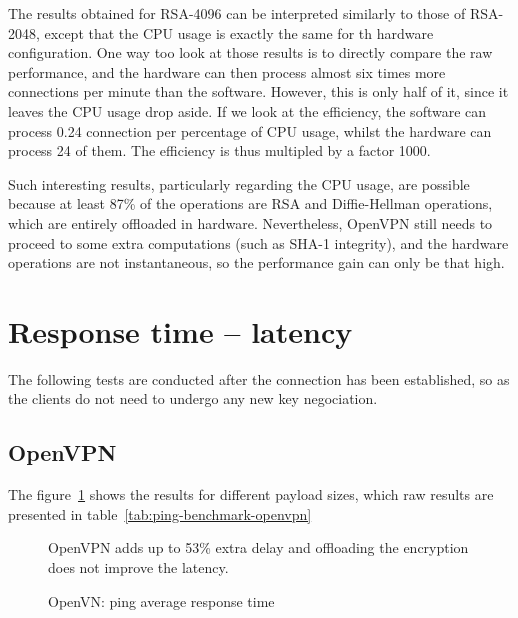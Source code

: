 \noindent The results obtained for RSA-4096 can be interpreted similarly to those of RSA-2048, except that the CPU usage is exactly the same for th hardware configuration.
One way too look at those results is to directly compare the raw performance, and the hardware can then process almost six times more connections per minute than the software.
However, this is only half of it, since it leaves the CPU usage drop aside.
If we look at the efficiency, the software can process 0.24 connection per percentage of CPU usage, whilst the hardware can process 24 of them.
The efficiency is thus multipled by a factor 1000.

Such interesting results, particularly regarding the CPU usage, are possible because at least 87\% of the operations are RSA and Diffie-Hellman operations, which are entirely offloaded in hardware.
Nevertheless, OpenVPN still needs to proceed to some extra computations (such as SHA-1 integrity), and the hardware operations are not instantaneous, so the performance gain can only be that high.












\section{Response time -- latency}
The following tests are conducted after the connection has been established, so as the clients do not need to undergo any new key negociation.

\subsection{OpenVPN}
The figure~\ref{fig:ping-benchmark-openvpn} shows the results for different payload sizes, which raw results are presented in table~\ref{tab:ping-benchmark-openvpn}

\begin{figure}[ht]

\caption{OpenVN: ping average response time}{OpenVPN adds up to 53\% extra delay and offloading the encryption does not improve the latency.}
\label{fig:ping-benchmark-openvpn}
\end{figure}

